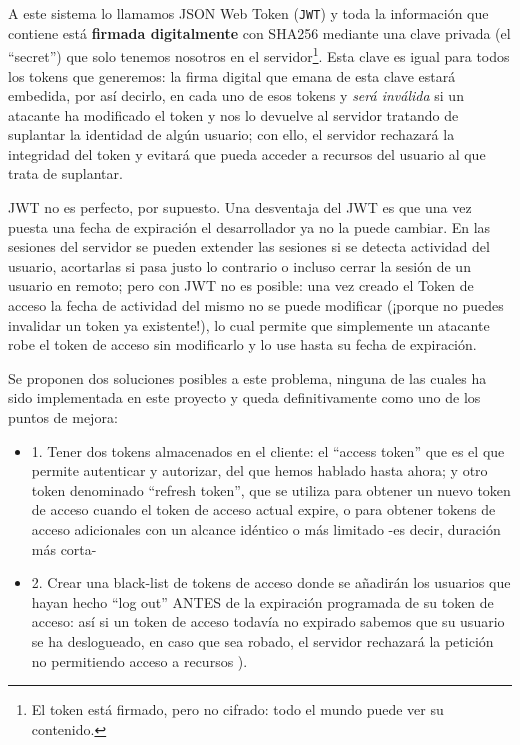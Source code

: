 \documentclass[a4paper,12pt]{report}
\begin{document}
				
				A este sistema lo llamamos JSON Web Token (\texttt{JWT}) y toda la información que contiene está \textbf{firmada digitalmente} con SHA256 mediante una clave privada (el ``secret'') que solo tenemos nosotros en el servidor\footnote{El token está firmado, pero no cifrado: todo el mundo puede ver su contenido.}. Esta clave es igual para todos los tokens que generemos: la firma digital que emana de esta clave estará embedida, por así decirlo, en cada uno de esos tokens y \textit{será inválida} si un atacante ha modificado el token y nos lo devuelve al servidor tratando de suplantar la identidad de algún usuario; con ello, el servidor rechazará la integridad del token y evitará que pueda acceder a recursos del usuario al que trata de suplantar.
				
				JWT no es perfecto, por supuesto. Una desventaja del JWT es que una vez puesta una fecha de expiración el desarrollador ya no la puede cambiar. En las sesiones del servidor se pueden extender las sesiones si se detecta actividad del usuario, acortarlas si pasa justo lo contrario o incluso cerrar la sesión de un usuario en remoto; pero con JWT no es posible: una vez creado el Token de acceso la fecha de actividad del mismo no se puede modificar (¡porque no puedes invalidar un token ya existente!), lo cual permite que simplemente un atacante robe el token de acceso sin modificarlo y lo use hasta su fecha de expiración.
				
				Se proponen dos soluciones posibles a este problema, ninguna de las cuales ha sido implementada en este proyecto y queda definitivamente como uno de los puntos de mejora:
				
				\begin{itemize}
					\setlength{\itemsep}{.0em}
				
					\item 1. Tener dos tokens almacenados en el cliente: el ``access token'' que es el que permite autenticar y autorizar, del que hemos hablado hasta ahora; y otro token denominado ``refresh token'', que se utiliza
					para obtener un nuevo token de acceso cuando el token de acceso actual expire, o para obtener tokens de acceso adicionales con un alcance idéntico o más limitado -es decir, duración más corta- \cite{stackoverflow_refreshTokenAvantatjaSeguretat}
					
					\item 2. Crear una black-list de tokens de acceso donde se añadirán los usuarios que hayan hecho ``log out'' ANTES de la expiración programada de su token de acceso: así si un token de acceso todavía no expirado sabemos que su usuario se ha deslogueado, en caso que sea robado, el servidor rechazará la petición no permitiendo acceso a recursos \cite{stackOverflow_blackList}).
 
					
				\end{itemize}
\end{document}

